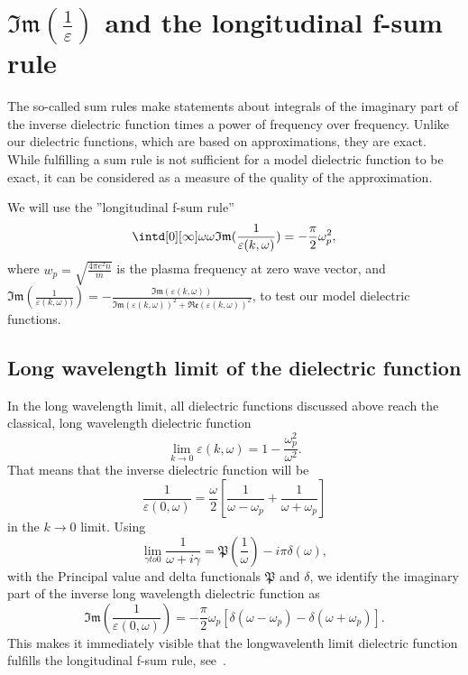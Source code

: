\documentclass[physics,phd,nolot,nolof]{uccthesis}%
\begin{document}
{\section{$\mathfrak{Im}(\frac{1}{\varepsilon})$ and the longitudinal f-sum rule}
\label{seq:sumrule}
The so-called sum rules\cite{mahanmany} make statements about integrals of the imaginary part of the inverse dielectric function times a power of frequency over frequency.
Unlike our dielectric functions, which are based on approximations, they are exact.
While fulfilling a sum rule is not sufficient for a model dielectric function to be exact, it can be considered as a measure of the quality of the approximation.

We will use the ''longitudinal f-sum rule''
\begin{equation}
  \intd[0][\infty]\omega \omega \mathfrak{Im}(\frac{1}{\varepsilon(k,\omega)})= - \frac{\pi}{2}\omega_p^2,
  \label{eq:longitudinal_fsumrule}
\end{equation}
where $w_p=\sqrt{\frac{4\pi e^2 n}{m}}$ is the plasma frequency at zero wave vector, 
and $\mathfrak{Im}(\frac{1}{\varepsilon(k,\omega))})= -\frac{\mathfrak{Im}(\varepsilon(k,\omega))}{\mathfrak{Im}(\varepsilon(k,\omega))^2 +\mathfrak{Re}(\varepsilon(k,\omega))^2}$,
to test our model dielectric functions.
\subsection{Long wavelength limit of the dielectric function}
In the long wavelength limit, all dielectric functions discussed above reach the classical, long wavelength dielectric function
\begin{equation}
  \lim_{k\to 0}\varepsilon(k,\omega)=1-\frac{\omega_p^2}{\omega^2}.
  \label{eq:eps_longwavelengthlimit}
\end{equation}
That means that the inverse dielectric function will be
\begin{equation}
  \frac{1}{\varepsilon(0,\omega)}=\frac{\omega}{2}\left[ \frac{1}{\omega-\omega_p}+\frac{1}{\omega+\omega_p}\right]
  \label{eq:invepslongwavelengthlimit}
\end{equation}
in the $k\to 0$ limit.
Using 
\begin{equation}
  \lim_{\gamma to 0} \frac{1}{\omega +i\gamma} = \mathfrak{P}(\frac{1}{\omega}) -i\pi\delta(\omega),
  \label{eq:deltafunction_principalvalue}
\end{equation}
with the Principal value and delta functionals $\mathfrak{P}$ and $\delta$,
we identify the imaginary part of the inverse long wavelength dielectric function 
as 
\begin{equation}
  \mathfrak{Im}(\frac{1}{\varepsilon(0,\omega)})=-\frac{\pi}{2}\omega_p \left[ \delta(\omega-\omega_p)-  \delta(\omega+\omega_p)\right].
  \label{eq:iminveps_longwavelength}
\end{equation}
This makes it immediately visible that the longwavelenth limit dielectric function fulfills the longitudinal f-sum rule, see~\cite{mahanmany}.
}
\end{document}
